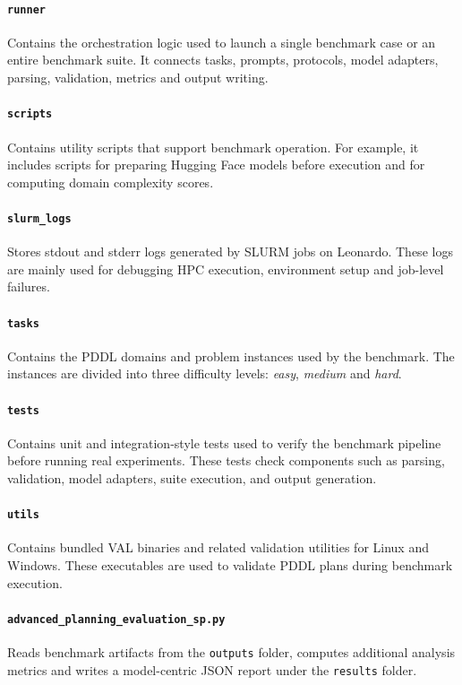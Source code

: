 \paragraph{\texttt{runner}}
Contains the orchestration logic used to launch a single benchmark case or an entire benchmark suite. It connects tasks, prompts, protocols, model adapters, parsing, validation, metrics and output writing.

\paragraph{\texttt{scripts}}
Contains utility scripts that support benchmark operation. For example, it includes scripts for preparing Hugging Face models before execution and for computing domain complexity scores.

\paragraph{\texttt{slurm_logs}}
Stores stdout and stderr logs generated by SLURM jobs on Leonardo. These logs are mainly used for debugging HPC execution, environment setup and job-level failures.

\paragraph{\texttt{tasks}}
Contains the PDDL domains and problem instances used by the benchmark. The instances are divided into three difficulty levels: \textit{easy}, \textit{medium} and \textit{hard}.

\paragraph{\texttt{tests}}
Contains unit and integration-style tests used to verify the benchmark pipeline before running real experiments. These tests check components such as parsing, validation, model adapters, suite execution, and output generation.

\paragraph{\texttt{utils}}
Contains bundled VAL binaries and related validation utilities for Linux and Windows. These executables are used to validate PDDL plans during benchmark execution.

\paragraph{\texttt{advanced_planning_evaluation_sp.py}}
Reads benchmark artifacts from the \texttt{outputs} folder, computes additional analysis metrics and writes a model-centric JSON report under the \texttt{results} folder.

